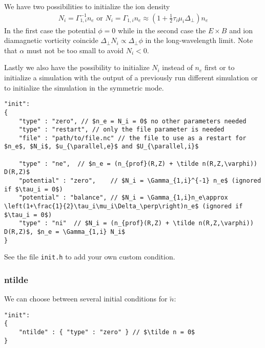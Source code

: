 We have two possibilities to initialize the ion density
\begin{align} \label{eq:initphi}
  N_i = \Gamma_{1,i}^{-1} n_e \text{ or } N_i = \Gamma_{1,i}n_e\approx \left(1+\frac{1}{2}\tau_i\mu_i\Delta_\perp\right)n_e
\end{align}
In the first case the potential $\phi= 0$ while in the second case
the $E\times B$ and ion diamagnetic vorticity coincide $\Delta_\perp N_i \propto \Delta_\perp \phi$ in the long-wavelength limit.
Note that $\alpha$ must not be too small to avoid $N_i < 0$.

Lastly we also have the possibility to initialize $N_i$ instead of $n_e$ first
or to initialize a simulation with the output of a previously
run different simulation or to initialize the simulation in the symmetric mode.
\begin{verbatim}
"init":
{
    "type" : "zero", // $n_e = N_i = 0$ no other parameters needed
    "type" : "restart", // only the file parameter is needed
    "file" : "path/to/file.nc" // the file to use as a restart for $n_e$, $N_i$, $u_{\parallel,e}$ and $U_{\parallel,i}$

    "type" : "ne",  // $n_e = (n_{prof}(R,Z) + \tilde n(R,Z,\varphi)) D(R,Z)$
    "potential" : "zero",    // $N_i = \Gamma_{1,i}^{-1} n_e$ (ignored if $\tau_i = 0$)
    "potential" : "balance", // $N_i = \Gamma_{1,i}n_e\approx \left(1+\frac{1}{2}\tau_i\mu_i\Delta_\perp\right)n_e$ (ignored if $\tau_i = 0$)
    "type" : "ni"  // $N_i = (n_{prof}(R,Z) + \tilde n(R,Z,\varphi)) D(R,Z)$, $n_e = \Gamma_{1,i} N_i$
}
\end{verbatim}
\noindent
See the file {\tt init.h} to add your own custom condition.
\subsubsection{ntilde} \label{sec:ntilde}
We can choose between several initial conditions for $\tilde n$:
\begin{verbatim}
"init":
{
    "ntilde" : { "type" : "zero" } // $\tilde n = 0$
}
\end{verbatim}

